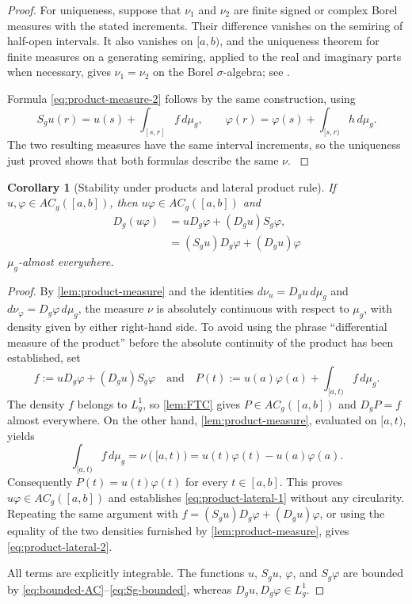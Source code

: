 \documentclass[preprint,12pt]{elsarticle}
\newenvironment{revision}{\begingroup\color{red}}{\endgroup}
\newenvironment{revision}{}{}
\newcommand{\newrev}[1]{{\color{red}#1}}
\newcommand{\newrev}[1]{#1}
\newtheorem{corollary}[theorem]{Corollary}
\theoremstyle{definition}
\theoremstyle{remark}
\newcommand{\mug}{\mu_g}
\newcommand{\ACg}{AC_g}
\begin{document}
\begin{proof}
\begin{revision}
 For uniqueness, suppose that \(\nu_1\) and \(\nu_2\) are finite signed or
 complex Borel measures with the stated increments.  Their difference vanishes
 on the semiring of half-open intervals.  It also vanishes on \([a,b)\), and the
 uniqueness theorem for finite measures on a generating semiring, applied to the
 real and imaginary parts when necessary, gives \(\nu_1=\nu_2\) on the Borel
 \(\sigma\)-algebra; see \cite{Bartle1995}.

 Formula \eqref{eq:product-measure-2} follows by the same construction, using
 \end{revision}
\[
 S_gu(r)=u(s)+\int_{[s,r]}f\,d\mug,
 \qquad
 \varphi(r)=\varphi(s)+\int_{[s,r)}h\,d\mug.
\]
\begin{revision}
The two resulting measures have the same interval increments, so the uniqueness
just proved shows that both formulas describe the same \(\nu\).
\end{revision}
\end{proof}

\begin{corollary}[Stability under products and lateral product rule]\label{cor:product-rule}
If $u,\varphi\in\ACg([a,b])$, then $u\varphi\in\ACg([a,b])$ and
\begin{align}
 D_g(u\varphi)
 &=uD_g\varphi+(D_gu)S_g\varphi,
 \label{eq:product-lateral-1}\\
 &=(S_gu)D_g\varphi+(D_gu)\varphi
 \label{eq:product-lateral-2}
\end{align}
$\mug$-almost everywhere.
\end{corollary}

\begin{proof}
By \cref{lem:product-measure} and the identities $d\nu_u=D_gu\,d\mug$ and $d\nu_\varphi=D_g\varphi\,d\mug$, the measure $\nu$ is absolutely continuous with respect to $\mug$, with density given by either right-hand side. \newrev{To avoid using the phrase ``differential measure of the product'' before the absolute continuity of the product has been established, set
\[
 f:=uD_g\varphi+(D_gu)S_g\varphi
 \quad\text{and}\quad
 P(t):=u(a)\varphi(a)+\int_{[a,t)}f\,d\mu_g.
\]
The density $f$ belongs to $L_g^1$, so \cref{lem:FTC} gives
$P\in AC_g([a,b])$ and $D_gP=f$ almost everywhere. On the other hand,
\cref{lem:product-measure}, evaluated on $[a,t)$, yields
\[
 \int_{[a,t)}f\,d\mu_g
 =\nu([a,t))
 =u(t)\varphi(t)-u(a)\varphi(a).
\]
Consequently $P(t)=u(t)\varphi(t)$ for every $t\in[a,b]$. This proves
$u\varphi\in AC_g([a,b])$ and establishes
\eqref{eq:product-lateral-1} without any circularity. Repeating the same
argument with
$f=(S_gu)D_g\varphi+(D_gu)\varphi$, or using the equality of the two
densities furnished by \cref{lem:product-measure}, gives
\eqref{eq:product-lateral-2}.}

All terms are explicitly integrable. The functions $u$, $S_gu$, $\varphi$, and $S_g\varphi$ are bounded by \eqref{eq:bounded-AC}--\eqref{eq:Sg-bounded}, whereas $D_gu,D_g\varphi\in L_g^1$.
\end{proof}
\end{document}
